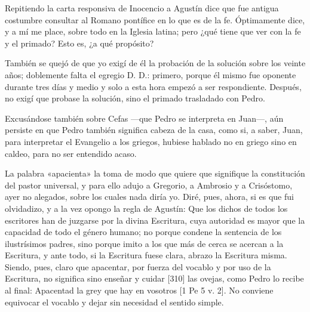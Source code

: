 Repitiendo la carta responsiva de Inocencio a Agustín dice que fue antigua costumbre consultar al Romano pontífice en lo que es de la fe. Óptimamente dice, y a mí me place, sobre todo en la Iglesia latina; pero ¿qué tiene que ver con la fe y el primado? Esto es, ¿a qué propósito?

También se quejó de que yo exigí de él la probación de la solución sobre los veinte años; doblemente falta el egregio D. D.: primero, porque él mismo fue oponente durante tres días y medio y solo a esta hora empezó a ser respondiente. Después, no exigí que probase la solución, sino el primado trasladado con Pedro.

Excusándose también sobre Cefas —que Pedro se interpreta en Juan—, aún persiste en que Pedro también significa cabeza de la casa, como si, a saber, Juan, para interpretar el Evangelio a los griegos, hubiese hablado no en griego sino en caldeo, para no ser entendido acaso.

La palabra «apacienta» la toma de modo que quiere que signifique la constitución del pastor universal, y para ello adujo a Gregorio, a Ambrosio y a Crisóstomo, ayer no alegados, sobre los cuales nada diría yo. Diré, pues, ahora, si es que fui olvidadizo, y a la vez opongo la regla de Agustín: Que los dichos de todos los escritores han de juzgarse por la divina Escritura, cuya autoridad es mayor que la capacidad de todo el género humano; no porque condene la sentencia de los ilustrísimos padres, sino porque imito a los que más de cerca se acercan a la Escritura, y ante todo, si la Escritura fuese clara, abrazo la Escritura misma. Siendo, pues, claro que apacentar, por fuerza del vocablo y por uso de la Escritura, no significa sino enseñar y cuidar [310] las ovejas, como Pedro lo recibe al final: Apacentad la grey que hay en vosotros [1 Pe 5 v. 2]. No conviene equivocar el vocablo y dejar sin necesidad el sentido simple.

